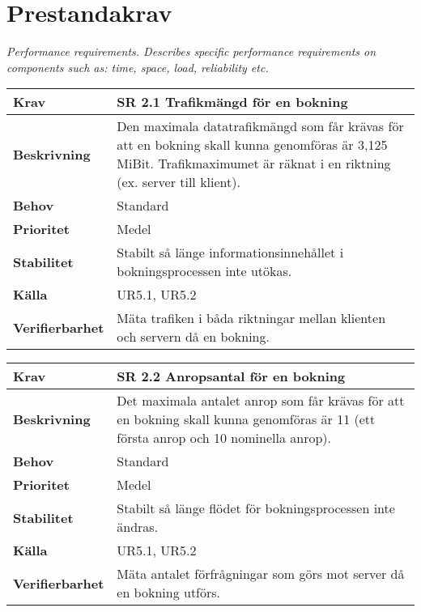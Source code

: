 \documentclass[a4paper, twoside, 11pt, titlepage]{article}
\begin{document}
\clearpage
\section{Prestandakrav}


\emph{Performance requirements. Describes specific performance requirements on components such as: time, space, load, reliability etc.}

\begin{tabular} { p{2.6cm} p{12.5cm} }
	\hline
	\sffamily\textbf{Krav} & \sffamily\textbf{SR 2.1 Trafikmängd för en bokning } \\
	\hline
	\sffamily\textbf{Beskrivning} & Den maximala datatrafikmängd som får krävas för att en bokning skall kunna genomföras är 3,125 MiBit. Trafikmaximumet är räknat i en riktning (ex. server till klient).  \\
	\hline
	\sffamily\textbf{Behov} & Standard  \\
	\hline
	\sffamily\textbf{Prioritet} & Medel  \\
	\hline
	\sffamily\textbf{Stabilitet} & Stabilt så länge informationsinnehållet i bokningsprocessen inte utökas.  \\
	\hline
	\sffamily\textbf{Källa} & UR5.1, UR5.2  \\
	\hline
	\sffamily\textbf{Verifierbarhet} & Mäta trafiken i båda riktningar mellan klienten och servern då en bokning.  \\
	\hline
\end{tabular}
\vspace{6mm}

\begin{tabular} { p{2.6cm} p{12.5cm} }
	\hline
	\sffamily\textbf{Krav} & \sffamily\textbf{SR 2.2 Anropsantal för en bokning } \\
	\hline
	\sffamily\textbf{Beskrivning} & Det maximala antalet anrop som får krävas för att en bokning skall kunna genomföras är 11 (ett första anrop och 10 nominella anrop).  \\
	\hline
	\sffamily\textbf{Behov} & Standard  \\
	\hline
	\sffamily\textbf{Prioritet} & Medel  \\
	\hline
	\sffamily\textbf{Stabilitet} & Stabilt så länge flödet för bokningsprocessen inte ändras.  \\
	\hline
	\sffamily\textbf{Källa} & UR5.1, UR5.2  \\
	\hline
	\sffamily\textbf{Verifierbarhet} & Mäta antalet förfrågningar som görs mot server då en bokning utförs.  \\
	\hline
\end{tabular}
\vspace{6mm}
\end{document}
